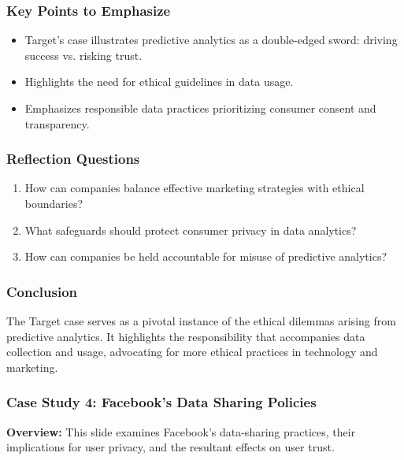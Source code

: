 \documentclass[aspectratio=169]{beamer}
\begin{document}
\begin{frame}[fragile]
    \frametitle{Key Points to Emphasize}
    \begin{itemize}
        \item Target's case illustrates predictive analytics as a double-edged sword: driving success vs. risking trust.
        \item Highlights the need for ethical guidelines in data usage.
        \item Emphasizes responsible data practices prioritizing consumer consent and transparency.
    \end{itemize}
\end{frame}

\begin{frame}[fragile]
    \frametitle{Reflection Questions}
    \begin{enumerate}
        \item How can companies balance effective marketing strategies with ethical boundaries?
        \item What safeguards should protect consumer privacy in data analytics?
        \item How can companies be held accountable for misuse of predictive analytics?
    \end{enumerate}
\end{frame}

\begin{frame}[fragile]
    \frametitle{Conclusion}
    The Target case serves as a pivotal instance of the ethical dilemmas arising from predictive analytics. It highlights the responsibility that accompanies data collection and usage, advocating for more ethical practices in technology and marketing.
\end{frame}

\begin{frame}[fragile]
    \frametitle{Case Study 4: Facebook's Data Sharing Policies}
    \textbf{Overview:} This slide examines Facebook's data-sharing practices, their implications for user privacy, and the resultant effects on user trust.
\end{frame}
\end{document}
